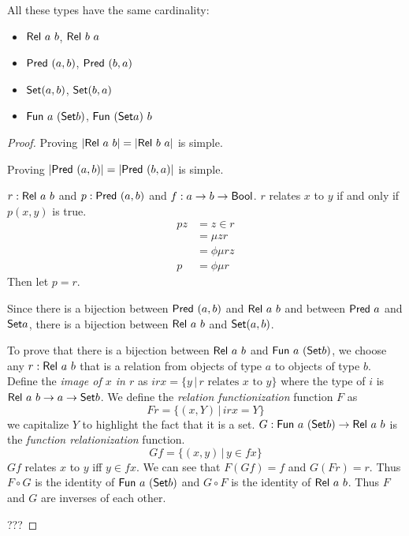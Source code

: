 \begin{mthm}
    All these types have the same cardinality:
    \begin{itemize}
        \item $\mathsf{Rel}~a~b$, $\mathsf{Rel}~b~a$
        \item $\mathsf{Pred}~(a,b)$, $\mathsf{Pred}~(b,a)$
        \item $\textsf{Set}{(a,b)}$, $\textsf{Set}{(b,a)}$
        \item $\mathsf{Fun}~a~(\textsf{Set}{b})$, $\mathsf{Fun}~(\textsf{Set}{a})~b$
    \end{itemize}
    \begin{proof}
        Proving $|\mathsf{Rel}~a~b| = |\mathsf{Rel}~b~a|$ is simple.

        Proving $|\mathsf{Pred}~(a,b)| = |\mathsf{Pred}~(b,a)|$ is simple.

        $r : \mathsf{Rel}~a~b$ and $p : \mathsf{Pred}~(a,b)$ and $f : a \to b \to \textsf{Bool}$.
        $r$ relates $x$ to $y$ if and only if $p(x,y)$ is true.
        \begin{align*}
            p z &= z \in r
             \\ &= \mu z r
             \\ &= \phi \mu r z
            \\
            p &= \phi \mu r
        \end{align*}
        Then let $p = r$.

        Since there is a bijection between $\mathsf{Pred}~(a,b)$ and $\mathsf{Rel}~a~b$
        and between $\mathsf{Pred}~a$ and $\textsf{Set}{a}$,
        there is a bijection between $\mathsf{Rel}~a~b$ and $\textsf{Set}{(a,b)}$.

        To prove that there is a bijection between $\mathsf{Rel}~a~b$ and $\mathsf{Fun}~a~(\textsf{Set}{b})$,
        we choose any $r : \mathsf{Rel}~a~b$ that is a relation
        from objects of type $a$ to objects of type $b$.
        Define the \emph{image of $x$ in $r$} as
        $i r x = \{ y \,|\, \text{$r$ relates $x$ to $y$} \}$
        where the type of $i$ is $\mathsf{Rel}~a~b \to a \to \textsf{Set}{b}$.
        We define the \emph{relation functionization} function $F$ as
        \[ F r = \{ (x,Y) \,|\, i r x = Y \} \]
        we capitalize $Y$ to highlight the fact that it is a set.
        $G : \mathsf{Fun}~a~(\textsf{Set}{b}) \to \mathsf{Rel}~a~b$ is the \emph{function relationization} function.
        \[ G f = \{ (x,y) \,|\, y \in f x \} \]
        $G f$ relates $x$ to $y$ iff $y \in f x$.
        We can see that $F(G f) = f$ and $G(F r) = r$.
        Thus $F \circ G$ is the identity of $\mathsf{Fun}~a~(\textsf{Set}{b})$
        and $G \circ F$ is the identity of $\mathsf{Rel}~a~b$.
        Thus $F$ and $G$ are inverses of each other.

        ???
    \end{proof}
\end{mthm}

